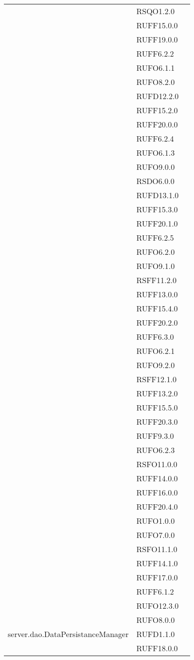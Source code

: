 \begin{center}
\begin{longtable}{lp{}l}
 & RSQO1.2.0 \\
 & RUFF15.0.0 \\
 & RUFF19.0.0 \\
 & RUFF6.2.2 \\
 & RUFO6.1.1 \\
 & RUFO8.2.0 \\
 & RUFD12.2.0 \\
 & RUFF15.2.0 \\
 & RUFF20.0.0 \\
 & RUFF6.2.4 \\
 & RUFO6.1.3 \\
 & RUFO9.0.0 \\
 & RSDO6.0.0 \\
 & RUFD13.1.0 \\
 & RUFF15.3.0 \\
 & RUFF20.1.0 \\
 & RUFF6.2.5 \\
 & RUFO6.2.0 \\
 & RUFO9.1.0 \\
 & RSFF11.2.0 \\
 & RUFF13.0.0 \\
 & RUFF15.4.0 \\
 & RUFF20.2.0 \\
 & RUFF6.3.0 \\
 & RUFO6.2.1 \\
 & RUFO9.2.0 \\
 & RSFF12.1.0 \\
 & RUFF13.2.0 \\
 & RUFF15.5.0 \\
 & RUFF20.3.0 \\
 & RUFF9.3.0 \\
 & RUFO6.2.3 \\
 & RSFO11.0.0 \\
 & RUFF14.0.0 \\
 & RUFF16.0.0 \\
 & RUFF20.4.0 \\
 & RUFO1.0.0 \\
 & RUFO7.0.0 \\
 & RSFO11.1.0 \\
 & RUFF14.1.0 \\
 & RUFF17.0.0 \\
 & RUFF6.1.2 \\
 & RUFO12.3.0 \\
 & RUFO8.0.0 \\
server.dao.DataPersistanceManager & RUFD1.1.0 \\
 & RUFF18.0.0 \\

\end{longtable}
\end{center}
